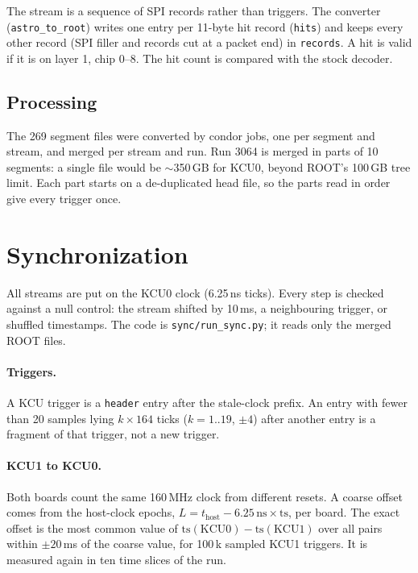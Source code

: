 \documentclass[11pt]{article}
\begin{document}
The stream is a sequence of SPI records rather than triggers. The converter (\texttt{astro\_to\_root}) writes
one entry per 11-byte hit record (\texttt{hits}) and keeps every other record (SPI filler and records cut at
a packet end) in \texttt{records}. A hit is valid if it is on layer 1, chip 0--8. The hit count is compared
with the stock decoder.

\subsection*{Processing}

The 269 segment files were converted by condor jobs, one per segment and stream, and merged per stream and
run. Run 3064 is merged in parts of 10 segments: a single file would be $\sim$350\,GB for KCU0, beyond ROOT's
100\,GB tree limit. Each part starts on a de-duplicated head file, so the parts read in order give every
trigger once.


\section*{Synchronization}

All streams are put on the KCU0 clock (6.25\,ns ticks). Every step is checked against a null control: the
stream shifted by 10\,ms, a neighbouring trigger, or shuffled timestamps. The code is
\texttt{sync/run\_sync.py}; it reads only the merged ROOT files.

\paragraph{Triggers.} A KCU trigger is a \texttt{header} entry after the stale-clock prefix. An entry with
fewer than 20 samples lying $k \times 164$ ticks ($k = 1..19$, $\pm 4$) after another entry is a fragment of
that trigger, not a new trigger.

\paragraph{KCU1 to KCU0.} Both boards count the same 160\,MHz clock from different resets. A coarse offset
comes from the host-clock epochs, $L = t_\mathrm{host} - 6.25\,\mathrm{ns} \times \mathrm{ts}$, per board.
The exact offset is the most common value of $\mathrm{ts}(\mathrm{KCU0}) - \mathrm{ts}(\mathrm{KCU1})$ over
all pairs within $\pm 20$\,ms of the coarse value, for 100\,k sampled KCU1 triggers. It is measured again in
ten time slices of the run.
\end{document}
